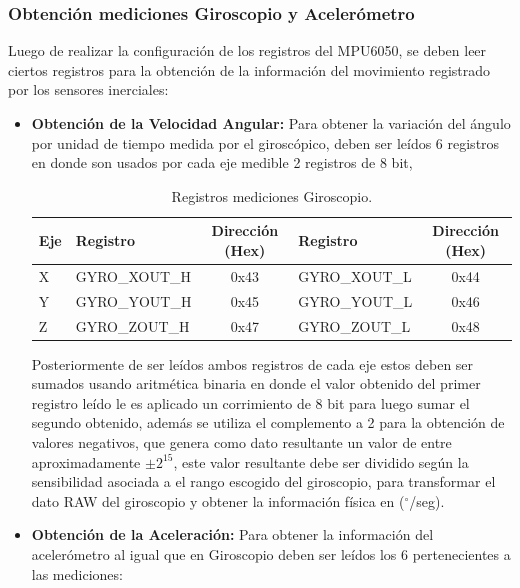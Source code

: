 \documentclass[12pt,a4paper]{article}
\newcommand{\grad}{$^{\circ}$}
\begin{document}
\subsubsection{Obtención mediciones Giroscopio y Acelerómetro}
Luego de realizar la configuración de los registros del MPU6050, se deben leer ciertos registros para la obtención de la información del movimiento registrado por los sensores inerciales:

\begin{itemize}
	\item \textbf{Obtención de la Velocidad Angular:} Para obtener la variación del ángulo por unidad de tiempo medida por el giroscópico, deben ser leídos 6 registros en donde son usados por cada eje medible 2 registros de 8 bit,
	
	\begin{table}[H]
		\centering
		\label{table:registrosgyro}
		\begin{tabular}{|l|l|c|l|c|}
			\hline
			\textbf{Eje} & \textbf{Registro} & \textbf{Dirección (Hex)} & \textbf{Registro} & \textbf{Dirección (Hex)} \\ \hline
			X            & GYRO\_XOUT\_H     & 0x43                     & GYRO\_XOUT\_L     & 0x44                     \\ \hline
			Y            & GYRO\_YOUT\_H     & 0x45                     & GYRO\_YOUT\_L     & 0x46                     \\ \hline
			Z            & GYRO\_ZOUT\_H     & 0x47                     & GYRO\_ZOUT\_L     & 0x48                     \\ \hline
		\end{tabular}
		\caption{Registros mediciones Giroscopio.}					
	\end{table}
	
	Posteriormente de ser leídos ambos registros de cada eje estos deben ser sumados usando aritmética binaria en donde el valor obtenido del primer registro leído le es aplicado un corrimiento de 8 bit para luego sumar el segundo obtenido, además se utiliza el complemento a 2 para la obtención de valores negativos, que genera como dato resultante un valor de entre aproximadamente $\pm 2^{15}$, este valor resultante debe ser dividido según la sensibilidad asociada a el rango escogido del giroscopio, para transformar el dato RAW del giroscopio y obtener la información física en (\grad/seg).
	
	\item \textbf{Obtención de la Aceleración:} Para obtener la información del acelerómetro al igual que en Giroscopio deben ser leídos los 6 pertenecientes a las mediciones:
	

\end{itemize}
\end{document}
